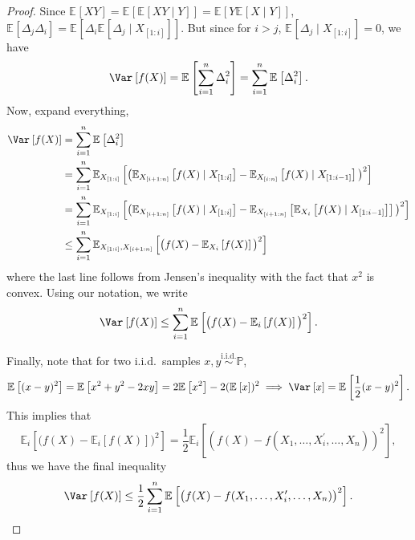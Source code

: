 \begin{proof}
	Since \(\mathbb{E}_{}\left[XY \right] = \mathbb{E}_{}\left[\mathbb{E}_{}\left[XY \mid Y \right] \right] = \mathbb{E}_{}\left[Y \mathbb{E}_{}\left[X \mid Y \right] \right] \), \(\mathbb{E}_{}\left[\Delta _j \Delta _i \right] = \mathbb{E}_{}\left[\Delta _i \mathbb{E}_{}\left[\Delta _j \mid X_{[1:i]} \right] \right] \). But since for \(i > j\), \(\mathbb{E}_{}\left[\Delta _j \mid X_{[1:i]} \right] = 0\), we have
	\[
		\Var_{}\left[f(X) \right] = \mathbb{E}_{}\left[\sum_{i=1}^{n} \Delta _i^2 \right] = \sum_{i=1}^{n} \mathbb{E}_{}\left[\Delta _i^2 \right] .
	\]
	Now, expand everything,
	\[
		\begin{split}
			\Var_{}\left[f(X) \right]
			 & = \sum_{i=1}^{n} \mathbb{E}_{}\left[\Delta _i^2 \right]                                                                                                                                                                    \\
			 & = \sum_{i=1}^{n} \mathbb{E}_{X_{[1:i]}}\left[\big( \mathbb{E}_{X_{[i+1:n]}}\left[f(X) \mid X_{[1:i]} \right] - \mathbb{E}_{X_{[i:n]}}\left[f(X) \mid X_{[1:i-1]} \right] \big)^2 \right]                                   \\
			 & = \sum_{i=1}^{n} \mathbb{E}_{X_{[1:i]}}\left[ \big( \mathbb{E}_{X_{[i+1:n]}}\left[f(X) \mid X_{[1:i]} \right] - \mathbb{E}_{X_{[i+1:n]}}\left[ \mathbb{E}_{X_i}\left[f(X) \mid X_{[1:i-1]} \right] \right] \big)^2 \right] \\
			 & \leq \sum_{i=1}^{n} \mathbb{E}_{X_{[1:i]}, X_{[i+1:n]}}\left[\big( f(X) - \mathbb{E}_{X_i}\left[f(X) \right] \big)^2 \right]
		\end{split}
	\]
	where the last line follows from Jensen's inequality with the fact that \(x^2\) is convex. Using our notation, we write
	\[
		\Var_{}\left[f(X) \right] \leq \sum_{i=1}^{n} \mathbb{E}_{}\left[\big(f(X) - \mathbb{E}_{i}\left[f(X) \right] \big)^2\right] .
	\]

	Finally, note that for two i.i.d.\ samples \(x, y \overset{\text{i.i.d.} }{\sim } \mathbb{P} \),
	\[
		\mathbb{E}_{}\left[(x-y)^2 \right] = \mathbb{E}_{}\left[x^2 + y^2 - 2xy \right] = 2 \mathbb{E}_{}\left[x^2 \right] - 2(\mathbb{E}_{}\left[x \right] )^2
		\implies \Var_{}\left[x \right] = \mathbb{E}_{}\left[\frac{1}{2}(x-y)^2 \right].
	\]
	This implies that
	\[
		\mathbb{E}_{i}\left[\big(f(X) - \mathbb{E}_{i}\left[f(X) \right] \big)^2 \right]
		= \frac{1}{2} \mathbb{E}_{i}\left[(f(X) - f(X_1, \dots , X_i^{\prime} , \dots , X_n))^2 \right] ,
	\]
	thus we have the final inequality
	\[
		\Var_{}\left[f(X) \right]
		\leq \frac{1}{2}\sum_{i=1}^{n} \mathbb{E}_{}\left[\big( f(X) - f(X_1, \dots , X_i^{\prime} , \dots , X_n) \big)^2 \right].
	\]
\end{proof}

